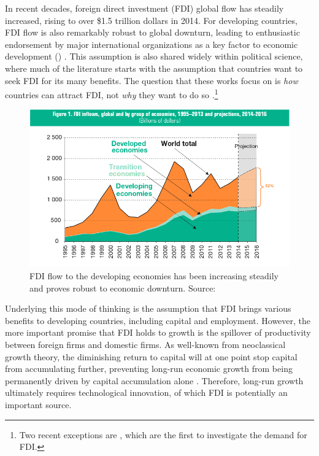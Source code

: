 In recent decades, foreign direct investment (FDI) global flow has steadily increased, rising to over \$1.5 trillion dollars in 2014. For developing countries, FDI flow is also remarkably robust to global downturn, leading to enthusiastic endorsement by major international organizations as a key factor to economic development () \citep{Mallampally1999, WorldEconomicForum2013}. This assumption is also shared widely within political science, where much of the literature starts with the assumption that countries want to seek FDI for its many benefits. The question that these works focus on is \textit{how} countries can attract FDI, not \textit{why} they want to do so \citep{Jensen2003, Li2003, Li2006, Ahlquist2006}.\footnote{Two recent exceptions are \citet{Pinto2013, Pandya2013}, which are the first to investigate the demand for FDI.} 

\begin{figure}[!ht]
\includegraphics[width=\textwidth, height=\textheight,keepaspectratio]{../figure/global_fdi}
\caption{FDI flow to the developing economies has been increasing steadily and proves robust to economic downturn. Source: \citet[xiii]{UNCTAD2014}}
\label{fig:globalfdi}
\end{figure}

Underlying this mode of thinking is the assumption that FDI brings various benefits to developing countries, including capital and employment. However, the more important promise that FDI holds to growth is the spillover of productivity between foreign firms and domestic firms. As well-known from neoclassical growth theory, the diminishing return to capital will at one point stop capital from accumulating further, preventing long-run economic growth from being permanently driven by capital accumulation alone \citep{Solow1956}. Therefore, long-run growth ultimately requires technological innovation, of which FDI is potentially an important source.

